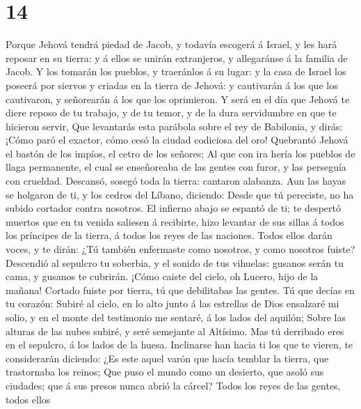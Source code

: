 \hypertarget{section-13}{%
\section{14}\label{section-13}}

 Porque Jehová tendrá piedad de Jacob, y todavía escogerá á
Israel, y les hará reposar en su tierra: y á ellos se unirán
extranjeros, y allegaránse á la familia de Jacob.  Y los
tomarán los pueblos, y traeránlos á su lugar: y la casa de Israel los
poseerá por siervos y criadas en la tierra de Jehová: y cautivarán á los
que los cautivaron, y señorearán á los que los oprimieron. 
Y será en el día que Jehová te diere reposo de tu trabajo, y de tu
temor, y de la dura servidumbre en que te hicieron servir, 
Que levantarás esta parábola sobre el rey de Babilonia, y dirás: ¡Cómo
paró el exactor, cómo cesó la ciudad codiciosa del oro! 
Quebrantó Jehová el bastón de los impíos, el cetro de los señores;
 Al que con ira hería los pueblos de llaga permanente, el
cual se enseñoreaba de las gentes con furor, y las perseguía con
crueldad.  Descansó, sosegó toda la tierra: cantaron
alabanza.  Aun las hayas se holgaron de ti, y los cedros del
Líbano, diciendo: Desde que tú pereciste, no ha subido cortador contra
nosotros.  El infierno abajo se espantó de ti; te despertó
muertos que en tu venida saliesen á recibirte, hizo levantar de sus
sillas á todos los príncipes de la tierra, á todos los reyes de las
naciones.  Todos ellos darán voces, y te dirán: ¿Tú también
enfermaste como nosotros, y como nosotros fuiste? 
Descendió al sepulcro tu soberbia, y el sonido de tus vihuelas: gusanos
serán tu cama, y gusanos te cubrirán.  ¡Cómo caiste del
cielo, oh Lucero, hijo de la mañana! Cortado fuiste por tierra, tú que
debilitabas las gentes.  Tú que decías en tu corazón:
Subiré al cielo, en lo alto junto á las estrellas de Dios ensalzaré mi
solio, y en el monte del testimonio me sentaré, á los lados del aquilón;
 Sobre las alturas de las nubes subiré, y seré semejante al
Altísimo.  Mas tú derribado eres en el sepulcro, á los
lados de la huesa.  Inclinarse han hacia ti los que te
vieren, te considerarán diciendo: ¿Es este aquel varón que hacía temblar
la tierra, que trastornaba los reinos;  Que puso el mundo
como un desierto, que asoló sus ciudades; que á sus presos nunca abrió
la cárcel?  Todos los reyes de las gentes, todos ellos

